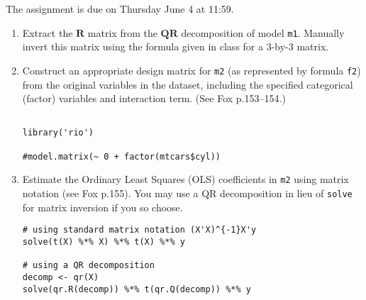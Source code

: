 \documentclass[a4paper,11pt]{article}
\newcommand{\matr}[1]{\mathbf{#1}}
\begin{document}
\vspace{1em}
\noindent The assignment is due on Thursday June 4 at 11:59.


\begin{enumerate}

\clearpage
\section{Ordinary Least Squares Regression}

\begin{lstlisting}
d <- rio::import("http://www.qogdata.pol.gu.se/data/qog_bas_cs_jan15.csv")
f1 <- une_leb ~ I(gle_cgdpc/1e4) + chga_demo + I(ross_oil_netexpc/1e3)
m1 <- lm(f1, data = d)

f2 <- une_leb ~ I(gle_cgdpc/1e4)*factor(chga_demo) + 
               I(ross_oil_netexpc/1e3) + factor(ht_colonial)
m2 <- lm(f2, data = d)
\end{lstlisting}

\item Extract the $\matr{R}$ matrix from the $\matr{Q}\matr{R}$ decomposition of model \texttt{m1}. Manually invert this matrix using the formula given in class for a 3-by-3 matrix.

\item Construct an appropriate design matrix for \texttt{m2} (as represented by formula \texttt{f2}) from the original variables in the dataset, including the specified categorical (factor) variables and interaction term. (See Fox p.153--154.)

\begin{solution}
\begin{lstlisting}

library('rio')

#model.matrix(~ 0 + factor(mtcars$cyl))

\end{lstlisting}
\end{solution}


\item Estimate the Ordinary Least Squares (OLS) coefficients in \texttt{m2} using matrix notation (see Fox p.155). You may use a QR decomposition in lieu of \texttt{solve} for matrix inversion if you so choose.

\begin{solution}
\begin{lstlisting}
# using standard matrix notation (X'X)^{-1}X'y
solve(t(X) %*% X) %*% t(X) %*% y

# using a QR decomposition
decomp <- qr(X)
solve(qr.R(decomp)) %*% t(qr.Q(decomp)) %*% y
\end{lstlisting}
\end{solution}


\end{enumerate}
\end{document}
